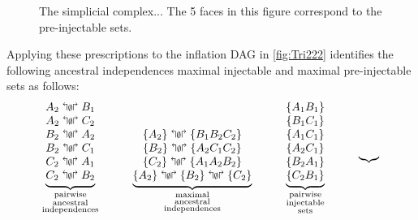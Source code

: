 \begin{figure}[t]
\begin{minipage}[b]{0.3\linewidth}
\caption{The simplicial complex... The 5 faces in this figure correspond to the pre-injectable sets.}\label{fig:simplicialcomplex222}
\end{minipage}
\end{figure}

Applying these prescriptions to the inflation DAG in \cref{fig:Tri222} identifies the following 
 ancestral independences 
maximal injectable and maximal pre-injectable sets as follows:
\begin{align}\label{eq:basicsetup222}
{\underbrace{\begin{matrix}
A_2\aindep B_1\\
A_2\aindep C_2\\
B_2\aindep A_2\\
B_2\aindep C_1\\
C_2\aindep A_1\\
C_2\aindep B_2
\end{matrix}}_{\substack{\text{pairwise}\\\text{ancestral}\\\text{independences}}}}
\qquad\quad
{\underbrace{\begin{matrix}
\\ \\
\brackets{A_2}\aindep \brackets{B_1 B_2 C_2}\\
\brackets{B_2}\aindep \brackets{A_2 C_1 C_2}\\
\brackets{C_2}\aindep \brackets{A_1 A_2 B_2}\\
\brackets{A_2}\aindep \brackets{B_2}\aindep \brackets{C_2}
\end{matrix}}_{\substack{\text{maximal}\\\text{ancestral}\\\text{independences}}}}
\qquad\quad
{\underbrace{\begin{matrix}
\brackets{ A_1 B_1 }\\
\brackets{ B_1 C_1 }\\
\brackets{ A_1 C_1 }\\
\brackets{ A_2 C_1 }\\
\brackets{ B_2 A_1 }\\
\brackets{ C_2 B_1 }\\
\end{matrix}}_{\substack{\text{pairwise}\\\text{injectable}\\\text{sets}}}}
\qquad\quad
{\underbrace{\begin{array}{l}
\\ \\

\end{array}}}
\end{align}
